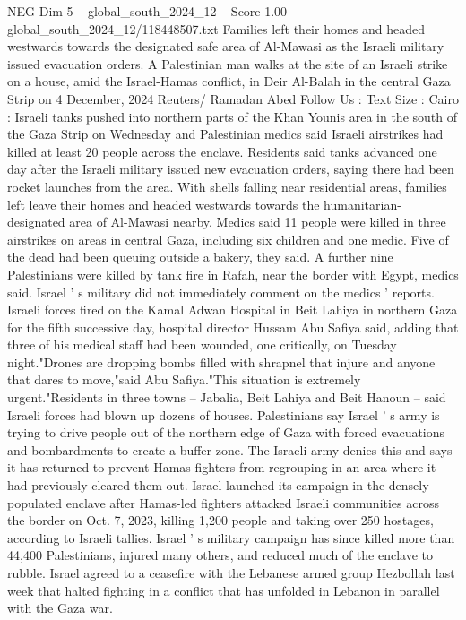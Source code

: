 \begin{textsample}{NEG Dim 5 – global\_south\_2024\_12 – Score 1.00 – global\_south\_2024\_12/118448507.txt}  \label{ex:f5_neg_410}
Families left their homes and headed westwards towards the designated safe area of Al-Mawasi as the Israeli military issued evacuation orders.
A Palestinian man walks at the site of an Israeli strike on a house, amid the Israel-Hamas conflict, in Deir Al-Balah in the central Gaza Strip on 4 December, 2024 Reuters/ Ramadan Abed Follow Us : Text Size : Cairo : Israeli tanks pushed into northern parts of the Khan Younis area in the south of the Gaza Strip on Wednesday and Palestinian medics said Israeli airstrikes had killed at least 20 people across the enclave.
Residents said tanks advanced one day after the Israeli military issued new evacuation orders, saying there had been rocket launches from the area.
With shells falling near residential areas, families left leave their homes and headed westwards towards the humanitarian-designated area of Al-Mawasi nearby.
Medics said 11 people were killed in three airstrikes on areas in central Gaza, including six children and one medic.
Five of the dead had been queuing outside a bakery, they said.
A further nine Palestinians were killed by tank fire in Rafah, near the border with Egypt, medics said.
Israel ' s military did not immediately comment on the medics ' reports.
Israeli forces fired on the Kamal Adwan Hospital in Beit Lahiya in northern Gaza for the fifth successive day, hospital director Hussam Abu Safiya said, adding that three of his medical staff had been wounded, one critically, on Tuesday night."Drones are dropping bombs filled with shrapnel that injure and anyone that dares to move,"said Abu Safiya."This situation is extremely urgent."Residents in three towns -- Jabalia, Beit Lahiya and Beit Hanoun -- said Israeli forces had blown up dozens of houses.
Palestinians say Israel ' s army is trying to drive people out of the northern edge of Gaza with forced evacuations and bombardments to create a buffer zone.
The Israeli army denies this and says it has returned to prevent Hamas fighters from regrouping in an area where it had previously cleared them out.
Israel launched its campaign in the densely populated enclave after Hamas-led fighters attacked Israeli communities across the border on Oct. 7, 2023, killing 1,200 people and taking over 250 hostages, according to Israeli tallies.
Israel ' s military campaign has since killed more than 44,400 Palestinians, injured many others, and reduced much of the enclave to rubble.
Israel agreed to a ceasefire with the Lebanese armed group Hezbollah last week that halted fighting in a conflict that has unfolded in Lebanon in parallel with the Gaza war.

\end{textsample}
